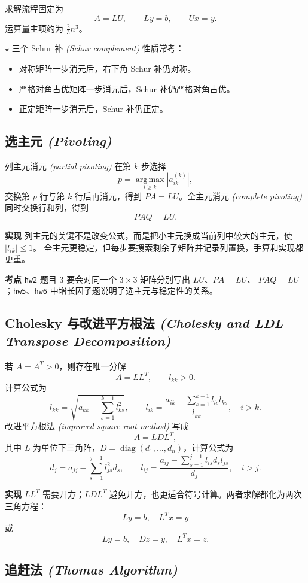 \documentclass{article}
\newcommand{\diag}{\operatorname{diag}}
\newcommand{\argmax}{\operatorname*{arg\,max}}
\newcommand{\keypoint}{\textcolor{red!65!black}{\textbf{$\star$}}}
\newcommand{\impl}{\textcolor{blue!65!black}{\textbf{实现}}}
\newcommand{\exam}{\textcolor{red!65!black}{\textbf{考点}}}
\newcommand{\eng}[1]{\texorpdfstring{{\normalfont\rmfamily\itshape\textcolor{blue!65!black}{(#1)}}}{(#1)}}
\begin{document}
求解流程固定为
\[
  A=LU,\qquad Ly=b,\qquad Ux=y.
\]
运算量主项约为 $\frac{2}{3}n^3$。

\keypoint{} 三个 Schur 补 \eng{Schur complement} 性质常考：
\begin{itemize}
  \item 对称矩阵一步消元后，右下角 Schur 补仍对称。
  \item 严格对角占优矩阵一步消元后，Schur 补仍严格对角占优。
  \item 正定矩阵一步消元后，Schur 补仍正定。
\end{itemize}

\subsection{选主元 \eng{Pivoting}}

列主元消元 \eng{partial pivoting} 在第 $k$ 步选择
\[
  p=\argmax_{i\ge k}|a_{ik}^{(k)}|,
\]
交换第 $p$ 行与第 $k$ 行后再消元，得到 $PA=LU$。全主元消元
\eng{complete pivoting} 同时交换行和列，得到
\[
  PAQ=LU.
\]

\impl{} 列主元的关键不是改变公式，而是把小主元换成当前列中较大的主元，使 $|l_{ik}|\le1$。
全主元更稳定，但每步要搜索剩余子矩阵并记录列置换，手算和实现都更重。

\exam{} \texttt{hw2} 题目 3 要会对同一个 $3\times3$ 矩阵分别写出 $LU$、$PA=LU$、
$PAQ=LU$；\texttt{hw5}、\texttt{hw6} 中增长因子题说明了选主元与稳定性的关系。

\subsection{Cholesky 与改进平方根法 \eng{Cholesky and LDL Transpose Decomposition}}

若 $A=A^T>0$，则存在唯一分解
\[
  A=LL^T,\qquad l_{kk}>0.
\]
计算公式为
\[
  l_{kk}=\sqrt{a_{kk}-\sum_{s=1}^{k-1}l_{ks}^2},\qquad
  l_{ik}=\frac{a_{ik}-\sum_{s=1}^{k-1}l_{is}l_{ks}}{l_{kk}},\quad i>k.
\]
改进平方根法 \eng{improved square-root method} 写成
\[
  A=LDL^T,
\]
其中 $L$ 为单位下三角阵，$D=\diag(d_1,\dots,d_n)$，计算公式为
\[
  d_j=a_{jj}-\sum_{s=1}^{j-1}l_{js}^2d_s,\qquad
  l_{ij}=\frac{a_{ij}-\sum_{s=1}^{j-1}l_{is}d_sl_{js}}{d_j},\quad i>j.
\]

\impl{} $LL^T$ 需要开方；$LDL^T$ 避免开方，也更适合符号计算。两者求解都化为两次三角方程：
\[
  Ly=b,\quad L^Tx=y
\]
或
\[
  Ly=b,\quad Dz=y,\quad L^Tx=z.
\]

\subsection{追赶法 \eng{Thomas Algorithm}}
\end{document}

